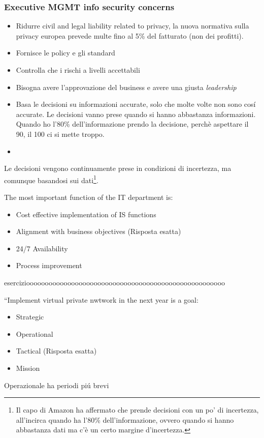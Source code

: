 \subsubsection{Executive MGMT info security concerns}

\begin{itemize}
\item Ridurre civil and legal liability related to privacy, la nuova normativa 
sulla privacy europea prevede multe fino al 5\% del fatturato (non dei 
profitti).
\item Fornisce le policy e gli standard
\item Controlla che i rischi a livelli accettabili
\item Bisogna avere l'approvazione del business e avere una giusta 
\textit{leadership}
\item Basa le decisioni su informazioni accurate, solo che molte volte non sono 
cosí accurate. Le decisioni vanno prese quando si hanno abbastanza informazioni. 
Quando ho l'80\% dell'informazione prendo la decisione, perchè aspettare il 90, 
il 100 ci si mette troppo.
\item {}
\end{itemize}


Le decisioni vengono continuamente prese in condizioni di incertezza, ma 
comunque basandosi sui dati\footnote{Il capo di Amazon ha affermato che prende 
decisioni con un po' di incertezza, all'incirca quando ha l'80\% 
dell'informazione, ovvero quando si hanno abbastanza dati ma c'è un certo 
margine d'incertezza.}.



The most important function of the IT department is:\begin{itemize}
\item Cost effective implementation of IS functions
\item Alignment with business objectives (Risposta esatta)
\item 24/7 Availability
\item Process improvement
\end{itemize}


eserciziooooooooooooooooooooooooooooooooooooooooooooooooooooo

``Implement virtual private nwtwork in the next year is a goal:
\begin{itemize}
\item Strategic
\item Operational 
\item Tactical (Risposta esatta)
\item Mission
\end{itemize}
Operazionale ha periodi piú brevi


